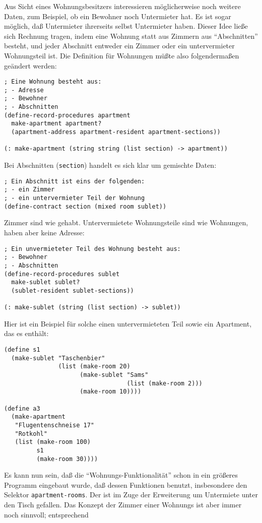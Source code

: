 Aus Sicht eines Wohnungsbesitzers interessieren möglicherweise noch
weitere Daten, zum Beispiel, ob ein Bewohner noch Untermieter hat.
Es ist sogar möglich, daß Untermieter ihrerseits selbst Untermieter
haben.  Dieser Idee ließe sich Rechnung tragen, indem eine Wohnung
statt aus Zimmern aus "`Abschnitten"' besteht, und jeder Abschnitt
entweder ein Zimmer oder ein untervermieter Wohnungsteil ist.  Die
Definition für Wohnungen müßte also folgendermaßen geändert werden:
%
\begin{verbatim}
; Eine Wohnung besteht aus:
; - Adresse
; - Bewohner
; - Abschnitten
(define-record-procedures apartment
  make-apartment apartment?
  (apartment-address apartment-resident apartment-sections))

(: make-apartment (string string (list section) -> apartment))
\end{verbatim}
%
Bei Abschnitten (\texttt{section}) handelt es sich klar um gemischte
Daten:
%
\begin{verbatim}
; Ein Abschnitt ist eins der folgenden:
; - ein Zimmer
; - ein untervermieter Teil der Wohnung
(define-contract section (mixed room sublet))
\end{verbatim}
%
Zimmer sind wie gehabt.   Untervermietete Wohnungsteile sind wie
Wohnungen, haben aber keine Adresse:
%
\begin{verbatim}
; Ein unvermieteter Teil des Wohnung besteht aus:
; - Bewohner
; - Abschnitten
(define-record-procedures sublet
  make-sublet sublet?
  (sublet-resident sublet-sections))

(: make-sublet (string (list section) -> sublet))
\end{verbatim}
%
Hier ist ein Beispiel für solche einen untervermieteten Teil sowie ein
Apartment, das es enthält:
%
\begin{verbatim}
(define s1
  (make-sublet "Taschenbier"
               (list (make-room 20) 
                     (make-sublet "Sams"
                                  (list (make-room 2)))
                     (make-room 10))))

(define a3
  (make-apartment
   "Flugentenschneise 17"
   "Rotkohl"
   (list (make-room 100)
         s1
         (make-room 30))))
\end{verbatim}
%
Es kann nun sein, daß die "`Wohnungs-Funktionalität"' schon in ein
größeres Programm eingebaut wurde, daß dessen Funktionen benutzt,
insbesondere den Selektor \texttt{apartment-rooms}.  Der ist im Zuge
der Erweiterung um Untermiete unter den Tisch gefallen.  Das Konzept
der Zimmer einer Wohnungs ist aber immer noch sinnvoll; entsprechend

